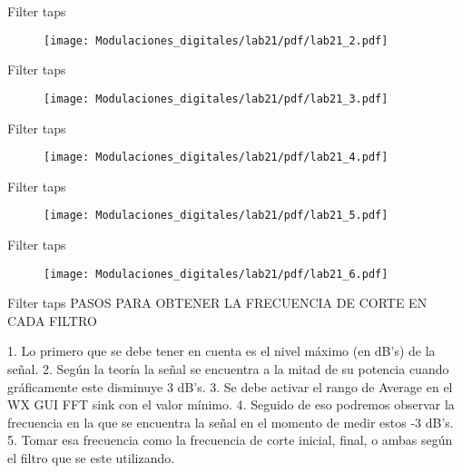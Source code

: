\begin{frame}{Filter taps}
\begin{figure}[H]
\centering
\vspace{-3mm}
\texttt{[image: Modulaciones\_digitales/lab21/pdf/lab21\_2.pdf]}
\end{figure}
\end{frame}


\begin{frame}{Filter taps}
\begin{figure}[H]
\centering
\vspace{-3mm}
\texttt{[image: Modulaciones\_digitales/lab21/pdf/lab21\_3.pdf]}
\end{figure}
\end{frame}

\begin{frame}{Filter taps}
\begin{figure}[H]
\centering
\vspace{-3mm}
\texttt{[image: Modulaciones\_digitales/lab21/pdf/lab21\_4.pdf]}
\end{figure}
\end{frame}


\begin{frame}{Filter taps}
\begin{figure}[H]
\centering
\vspace{-3mm}
\texttt{[image: Modulaciones\_digitales/lab21/pdf/lab21\_5.pdf]}
\end{figure}
\end{frame}


\begin{frame}{Filter taps}
\begin{figure}[H]
\centering
\vspace{-3mm}
\texttt{[image: Modulaciones\_digitales/lab21/pdf/lab21\_6.pdf]}
\end{figure}
\end{frame}

\begin{frame}{Filter taps}
PASOS PARA OBTENER LA FRECUENCIA DE CORTE EN CADA FILTRO
\begin{flushleft}
1.	Lo primero que se debe tener en cuenta es el nivel máximo  (en dB’s) de la señal.
2.	Según la teoría la señal se encuentra a la mitad de su potencia cuando gráficamente este disminuye 3 dB’s.
3.	Se debe activar el rango de Average en el WX GUI FFT sink  con el valor mínimo.
4.	Seguido de eso podremos observar la frecuencia en la que se encuentra la señal en el momento de medir estos -3 dB’s.
5.	Tomar esa frecuencia como la frecuencia de corte inicial, final, o ambas según el filtro que se este utilizando. 
\end{flushleft}
\end{frame}




